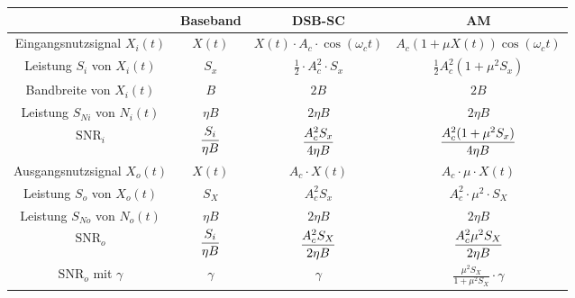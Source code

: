 \documentclass[a4paper]{article}
\begin{document}
\begin{twocolumn}
\begin{footnotesize}
\begin{tabular}{|c|c|c|c|}
  \hline
   & \textbf{Baseband} & \textbf{DSB-SC} & \textbf{AM} \\ \hline
  Eingangsnutzsignal $X_i(t)$ & 
  $X(t)$ & $X(t) \cdot A_c \cdot \cos(\omega_c t)$ & $A_c (1 + \mu X(t)) \cos(\omega_c t)$ \\\hline
  Leistung $S_i$ von $X_i(t)$ & $S_x$ & $\frac{1}{2} \cdot A_c^2 \cdot S_x$ & 
  $\frac{1}{2}A_c^2 (1 + \mu^2 S_x)$ \\ \hline
  Bandbreite von $X_i(t)$ & $B$ & $2B$ & $2B$ \\ \hline
  Leistung $S_{Ni}$ von $N_i(t)$ & $\eta B$ & $2 \eta B$ & $2 \eta B$ \\ \hline
  $\text{SNR}_i$ & $\displaystyle \frac{S_i}{\eta B}$ & $\displaystyle \frac{A_c^2 S_x}{4 \eta B}$ & 
  $\displaystyle \frac{A_c^2 (1 + \mu^2 S_x)}{4 \eta B}$ \\ \hline
  Ausgangsnutzsignal $X_o(t)$ & $X(t)$ & $A_c \cdot X(t)$ & $A_c \cdot \mu \cdot X(t)$ \\ \hline
  Leistung $S_o$ von $X_o(t)$ & $S_X$ & $A_c^2 S_x$ & $A_c^2 \cdot \mu^2 \cdot S_X$ \\ \hline
  Leistung $S_{No}$ von $N_o(t)$ & $\eta B$ & $2 \eta B$ & $2 \eta B$ \\ \hline
  $\text{SNR}_o$ & $\displaystyle \frac{S_i}{\eta B}$ & $\displaystyle \frac{A_c^2 S_X}{2 \eta B}$ & 
  $\displaystyle \frac{A_c^2 \mu^2 S_X}{2 \eta B}$ \\ \hline
  $\text{SNR}_o$ mit $\gamma$ & $\gamma$ & $\gamma$ & $\frac{\mu^2 S_X}{1 + \mu^2 S_X} 
  \cdot \gamma$ \\ \hline 
\end{tabular} 


\end{footnotesize}
\end{twocolumn}
\end{document}
